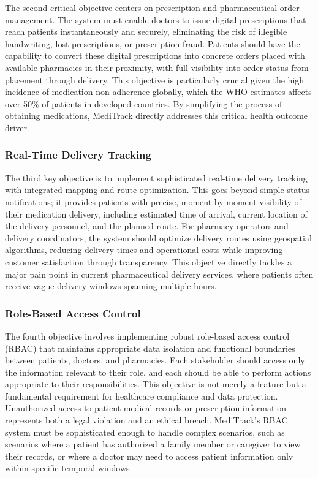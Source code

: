 \documentclass[12pt,a4paper]{report}
\begin{document}
The second critical objective centers on prescription and pharmaceutical order management. The system must enable doctors to issue digital prescriptions that reach patients instantaneously and securely, eliminating the risk of illegible handwriting, lost prescriptions, or prescription fraud. Patients should have the capability to convert these digital prescriptions into concrete orders placed with available pharmacies in their proximity, with full visibility into order status from placement through delivery. This objective is particularly crucial given the high incidence of medication non-adherence globally, which the WHO estimates affects over 50\% of patients in developed countries. By simplifying the process of obtaining medications, MediTrack directly addresses this critical health outcome driver.

\subsubsection{Real-Time Delivery Tracking}

The third key objective is to implement sophisticated real-time delivery tracking with integrated mapping and route optimization. This goes beyond simple status notifications; it provides patients with precise, moment-by-moment visibility of their medication delivery, including estimated time of arrival, current location of the delivery personnel, and the planned route. For pharmacy operators and delivery coordinators, the system should optimize delivery routes using geospatial algorithms, reducing delivery times and operational costs while improving customer satisfaction through transparency. This objective directly tackles a major pain point in current pharmaceutical delivery services, where patients often receive vague delivery windows spanning multiple hours.

\subsubsection{Role-Based Access Control}

The fourth objective involves implementing robust role-based access control (RBAC) that maintains appropriate data isolation and functional boundaries between patients, doctors, and pharmacies. Each stakeholder should access only the information relevant to their role, and each should be able to perform actions appropriate to their responsibilities. This objective is not merely a feature but a fundamental requirement for healthcare compliance and data protection. Unauthorized access to patient medical records or prescription information represents both a legal violation and an ethical breach. MediTrack's RBAC system must be sophisticated enough to handle complex scenarios, such as scenarios where a patient has authorized a family member or caregiver to view their records, or where a doctor may need to access patient information only within specific temporal windows.
\end{document}
